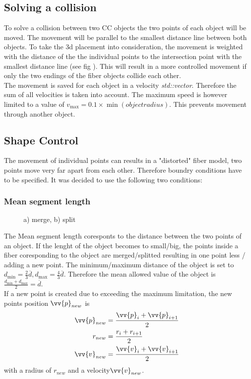 \subsection{Solving a collision}
To solve a collision between two \ac{CC} objects the two points of each object will be moved. The movement will be parallel to the smallest distance line between both objects. To take the 3d placement into consideration, the movement is weighted with the distance of the the individual points to the intersection point with the smallest distance line (see fig \dummy). This will result in a more controlled movement if \eg only the two endings of the fiber objects collide each other. \\
% 
The movement is saved for each object in a velocity \textit{std::vector}. Therefore the sum of all velocities is taken into account. The maximum speed is however limited to a value of $v_{\max} = 0.1 \times \min(object radius)$. This prevents movement through another object.
% 
\subsection{Shape Control}
The movement of individual points can results in a "distorted" fiber model, \eg two points move very far apart from each other. Therefore boundry conditions have to be specified. It was decided to use the following two conditions:
% 
\subsubsection{Mean segment length}
% 
\begin{figure}[!tb]
    
	\caption{a) merge, b) split}
	\label{fig:merge_split}
\end{figure}
% 
The Mean segment length coresponts to the distance between the two points of an object. If the lenght of the object becomes to small/big, the points inside a fiber coresponding to the object are merged/splitted resulting in one point less / adding a new point. The minimum/maximum distance of the object is set to $d_{\min} = \frac{2}{3} \overline{d}, d_{\max} = \frac{4}{3}\overline{d}$. Therefore the mean allowed value of the object is $\frac{d_{\min} + d_{\max}}{2} = \overline{d}$. \\
% 
If a new point is created due to exceeding the maximum limitation, the new points position $\vv{p}_{new}$ is 
\begin{align}
\begin{split}
\vv{p}_{new} &= \frac{\vv{p}_{i} + \vv{p}_{i+1}}{2}\\
r_{new} &= \frac{r_{i} + r_{i+1}}{2}\\
\vv{v}_{new} &= \frac{\vv{v}_{i} + \vv{v}_{i+1}}{2}
\end{split}
\end{align}
with a radius of $r_{new}$ and a velocity$\vv{v}_{new}$.
% 
